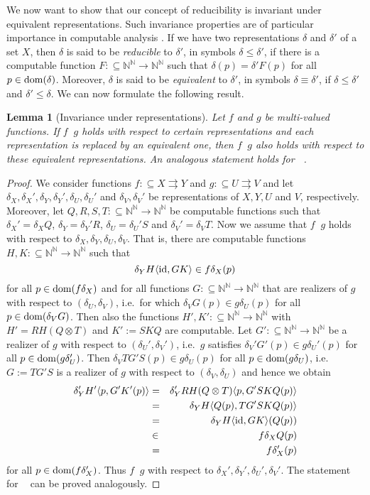 \documentclass[jsl,10pt]{noasl}
\def\IN{{\mathbb{N}}}
\def\In{\subseteq}
\def\mto{\rightrightarrows}
\def\id{{\rm id}}
\def\dom{{\rm dom}}
\def\leqW{\mathop{\leq_{\mathrm{W}}}}
\def\leqSW{\mathop{\leq_{\mathrm{sW}}}}
\newtheorem{lemma}[proposition]{Lemma}
\begin{document}
We now want to show that our concept of reducibility is 
invariant under equivalent representations. 
Such invariance properties are of particular importance in computable analysis \cite{Wei00}.
If we have two representations
$\delta$ and $\delta'$ of a set $X$, then $\delta$ is said to be {\em reducible}
to $\delta'$, in symbols $\delta\leq\delta'$,
if there is a computable function $F:\In\IN^\IN\to\IN^\IN$ such that
$\delta(p)=\delta'F(p)$ for all $p\in\dom(\delta)$. 
Moreover, $\delta$ is said to be {\em equivalent} to $\delta'$, in
symbols $\delta\equiv\delta'$, if $\delta\leq\delta'$ and $\delta'\leq\delta$.
We can now formulate the following result.

\begin{lemma}[Invariance under representations]
Let $f$ and $g$ be multi-valued functions.
If $f\leqW g$ holds with respect to certain representations
and each representation is replaced by an equivalent one, then $f\leqW g$ also
holds with respect to these equivalent representations.
An analogous statement holds for $\leqSW$.
\end{lemma}
\begin{proof}
We consider functions $f:\In X\mto Y$ and $g:\In U\mto V$ and
let $\delta_X,\delta_X',\delta_Y,\delta_Y',\delta_U,\delta_U'$ and $\delta_V,\delta_V'$
be representations of $X,Y,U$ and $V$, respectively. Moreover, let $Q,R,S,T:\In\IN^\IN\to\IN^\IN$
be computable functions such that $\delta_X'=\delta_XQ$, $\delta_Y=\delta_Y'R$,
$\delta_U=\delta_U'S$ and $\delta_V'=\delta_VT$. 
Now we assume that $f\leqW g$ holds with respect to $\delta_X,\delta_Y,\delta_U,\delta_V$.
That is, there are computable functions $H,K:\In\IN^\IN\to\IN^\IN$ such that
\[\delta_YH\langle\id,GK\rangle\in f\delta_X(p)\]
for all $p\in\dom(f\delta_X)$ and for all functions $G:\In\IN^\IN\to\IN^\IN$ 
that are realizers of $g$ with respect to $(\delta_U,\delta_V)$, i.e.\ for which
$\delta_VG(p)\in g\delta_U(p)$ for all $p\in\dom(\delta_VG)$.
Then also the functions $H',K':\In\IN^\IN\to\IN^\IN$ with 
$H'=RH(Q\otimes T)$ and $K':=SKQ$ are computable.
Let $G':\In\IN^\IN\to\IN^\IN$ be a realizer of $g$ with respect to $(\delta_U',\delta_V')$,
i.e.\ $g$ satisfies
$\delta_V'G'(p)\in g\delta_U'(p)$ for all $p\in\dom(g\delta_U')$. 
Then $\delta_VTG'S(p)\in g\delta_U(p)$ for all $p\in\dom(g\delta_U)$,
i.e.\ $G:=TG'S$ is a realizer of $g$ with respect to $(\delta_V,\delta_U)$
and hence we obtain
\begin{eqnarray*}
\delta_Y'H'\langle p,G'K'(p)\rangle
&=& \delta_Y'RH(Q\otimes T)\langle p,G'SKQ(p)\rangle\\
&=& \delta_YH\langle Q(p),TG'SKQ(p)\rangle\\
&=& \delta_YH\langle\id,GK\rangle(Q(p))\\
&\in& f\delta_XQ(p)\\
&=& f\delta_X'(p)
\end{eqnarray*}
for all $p\in\dom(f\delta_X')$.
Thus $f\leqW g$ with respect to $\delta_X',\delta_Y',\delta_U',\delta_V'$.
The statement for $\leqSW$ can be proved analogously.
\end{proof}
\end{document}
